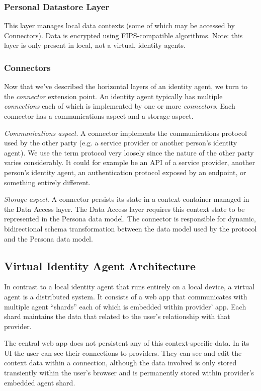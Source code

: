\documentclass[11pt, oneside]{article}   	%
\begin{document}
\subsubsection{Personal Datastore Layer}

This layer manages local data contexts (some of which may be accessed by Connectors). Data is encrypted using FIPS-compatible algorithms. Note: this layer is only present in local, not a virtual, identity agents.

\subsubsection{Connectors}

Now that we've described the horizontal layers of an identity agent, we turn to the \emph{connector} extension point. An identity agent typically has multiple \emph{connections} each of which is implemented by one or more \emph{connectors}. Each connector has a communications aspect and a storage aspect.

\emph{Communications aspect}. A connector implements the communications protocol used by the other party (e.g. a service provider or another person's identity agent). We use the term protocol very loosely since the nature of the other party varies considerably. It could for example be an API of a service provider, another person's identity agent, an authentication protocol exposed by an endpoint, or something entirely different.

\emph{Storage aspect}. A connector persists its state in a context container managed in the Data Access layer. The Data Access layer requires this context state to be represented in the Persona data model. The connector is responsible for dynamic, bidirectional schema transformation between the data model used by the protocol and the Persona data model. 

\subsection{Virtual Identity Agent Architecture}

In contrast to a local identity agent that runs entirely on a local device, a virtual agent is a distributed system. It consists of a web app that communicates with multiple agent ``shards'' each of which is embedded within provider' app. Each shard maintains the data that related to the user's relationship with that provider. 

The central web app does not persistent any of this context-specific data. In its UI the user can see their connections to providers. They can see and edit the context data within a connection, although the data involved is only stored transiently within the user's browser and is permanently stored within provider's embedded agent shard.
\end{document}
